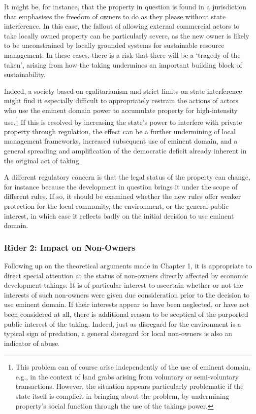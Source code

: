 It might be, for instance, that the property in question is found in a jurisdiction that emphasises  the freedom of owners to do as they please without state interference. In this case, the fallout of allowing external commercial actors to take locally owned property can be particularly severe, as the new owner is likely to be unconstrained by locally grounded systems for sustainable resource management. In these cases, there is a risk that there will be a `tragedy of the taken', arising from how the taking undermines an important building block of sustainability. 

Indeed, a society based on egalitarianism and strict limits on state interference might find it especially difficult to appropriately restrain the actions of actors who use the eminent domain power to accumulate property for high-intensity use.\footnote{This problem can of course arise independently of the use of eminent domain, e.g., in the context of land grabs arising from voluntary or semi-voluntary transactions. However, the situation appears particularly problematic if the state itself is complicit in bringing about the problem, by undermining property's social function through the use of the takings power.} If this is resolved by increasing the state's power to interfere with private property through regulation, the effect can be a further undermining of local management frameworks, increased subsequent use of eminent domain, and a general spreading and amplification of the democratic deficit already inherent in the original act of taking.

A different regulatory concern is that the legal status of the property can change, for instance because the development in question brings it under the scope of different rules. If so, it should be examined whether the new rules offer weaker protection for the local community, the environment, or the general public interest, in which case it reflects badly on the initial decision to use eminent domain.%

\subsubsection*{Rider 2: Impact on Non-Owners}

Following up on the theoretical arguments made in Chapter 1, it is appropriate to direct special attention at the status of non-owners directly affected by economic development takings. It is of particular interest to ascertain whether or not the interests of such non-owners were given due consideration prior to the decision to use eminent domain. If their interests appear to have been neglected, or have not been considered at all, there is additional reason to be sceptical of the purported public interest of the taking. Indeed, just as disregard for the environment is a typical sign of predation, a general disregard for local non-owners is also an indicator of abuse.


